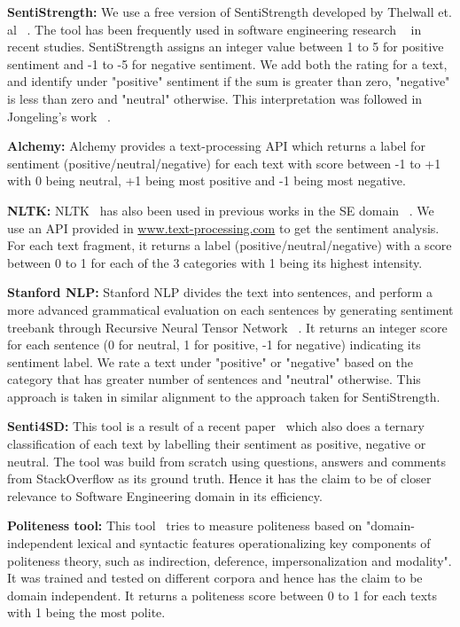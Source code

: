 \textbf{SentiStrength:} We use a free version of SentiStrength developed by Thelwall et. al ~\cite{thelwall2010sentiment}. The tool has been frequently used in software engineering research ~\cite{garcia2013role,guzman2014sentiment,novielli2015challenges,guzman2013towards} in recent studies. SentiStrength assigns an integer value between 1 to 5 for positive sentiment and -1 to -5 for negative sentiment. We add both the rating for a text, and identify under "positive" sentiment if the sum is greater than zero, "negative" is less than zero and "neutral" otherwise. This interpretation was followed in Jongeling's work ~\cite{jongeling2017negative}.

\textbf{Alchemy:} Alchemy provides a text-processing API which returns a label for sentiment (positive/neutral/negative) for each text with score between -1 to +1 with 0 being neutral, +1 being most positive and -1 being most negative.

\textbf{NLTK:} NLTK~\cite{bird2009natural} has also been used in previous works in the SE domain ~\cite{pletea2014security,rousinopoulos2014sentiment}. We use an API provided in \href{www.text-processing.com}{www.text-processing.com} to get the sentiment analysis. For each text fragment, it returns a label (positive/neutral/negative) with a score between 0 to 1 for each of the 3 categories with 1 being its highest intensity.

\textbf{Stanford NLP:} Stanford NLP divides the text into sentences, and perform a more advanced grammatical evaluation on each sentences by generating sentiment treebank through Recursive Neural Tensor Network ~\cite{socher2013recursive}. It returns an integer score for each sentence (0 for neutral, 1 for positive, -1 for negative) indicating its sentiment label. We rate a text under "positive" or "negative" based on the category that has greater number of sentences and "neutral" otherwise. This approach is taken in similar alignment to the approach taken for SentiStrength.

\textbf{Senti4SD:} This tool is a result of a recent paper~\cite{calefato2017sentiment} which also does a ternary classification of each text by labelling their sentiment as positive, negative or neutral. The tool was build from scratch using questions, answers and comments from StackOverflow as its ground truth. Hence it has the claim to be of closer relevance to Software Engineering domain in its efficiency.

\textbf{Politeness tool:} This tool~\cite{danescu2013computational} tries to measure politeness based on "domain-independent lexical and syntactic features operationalizing key components of politeness theory, such as indirection, deference, impersonalization and modality". It was trained and tested on different corpora and hence has the claim to be domain independent. It returns a politeness score between 0 to 1 for each texts with 1 being the most polite.


